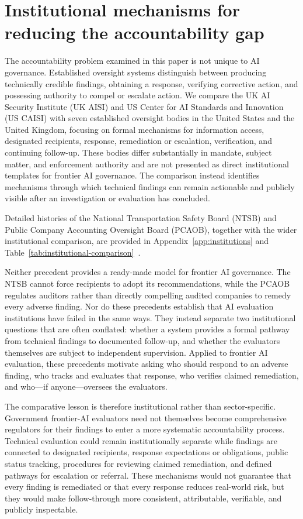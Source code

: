 \documentclass{article}
\begin{document}
\section{Institutional mechanisms for reducing the accountability gap}\label{sec:industries}
The accountability problem examined in this paper is not unique to AI governance. Established oversight systems distinguish between producing technically credible findings, obtaining a response, verifying corrective action, and possessing authority to compel or escalate action. We compare the UK AI Security Institute (UK AISI) and US Center for AI Standards and Innovation (US CAISI) with seven established oversight bodies in the United States and the United Kingdom, focusing on formal mechanisms for information access, designated recipients, response, remediation or escalation, verification, and continuing follow-up. These bodies differ substantially in mandate, subject matter, and enforcement authority and are not presented as direct institutional templates for frontier AI governance. The comparison instead identifies mechanisms through which technical findings can remain actionable and publicly visible after an investigation or evaluation has concluded.

Detailed histories of the National Transportation Safety Board (NTSB) and Public Company Accounting Oversight Board (PCAOB), together with the wider institutional comparison, are provided in Appendix~\ref{app:institutions} and Table~\ref{tab:institutional-comparison}~\citep{uscode1135,ntsb2024,gao2002,sec2003,pcaob2013}.

Neither precedent provides a ready-made model for frontier AI governance. The NTSB cannot force recipients to adopt its recommendations, while the PCAOB regulates auditors rather than directly compelling audited companies to remedy every adverse finding. Nor do these precedents establish that AI evaluation institutions have failed in the same ways. They instead separate two institutional questions that are often conflated: whether a system provides a formal pathway from technical findings to documented follow-up, and whether the evaluators themselves are subject to independent supervision. Applied to frontier AI evaluation, these precedents motivate asking who should respond to an adverse finding, who tracks and evaluates that response, who verifies claimed remediation, and who---if anyone---oversees the evaluators.

The comparative lesson is therefore institutional rather than sector-specific. Government frontier-AI evaluators need not themselves become comprehensive regulators for their findings to enter a more systematic accountability process. Technical evaluation could remain institutionally separate while findings are connected to designated recipients, response expectations or obligations, public status tracking, procedures for reviewing claimed remediation, and defined pathways for escalation or referral. These mechanisms would not guarantee that every finding is remediated or that every response reduces real-world risk, but they would make follow-through more consistent, attributable, verifiable, and publicly inspectable.
\end{document}
